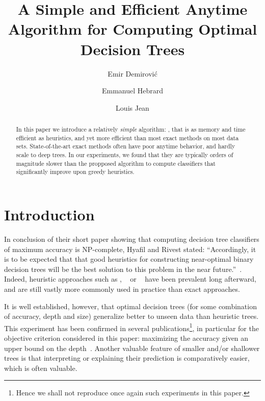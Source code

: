 \documentclass{llncs}
\title{A Simple and Efficient Anytime Algorithm for Computing Optimal Decision Trees}
\author{Emir Demirovi\'c\inst{1} \and Emmanuel Hebrard\inst{2} \and Louis Jean\inst{2}}
\institute{TU DELFT, The Netherlands, email: e.demirovic@tudelft.nl
  \and LAAS-CNRS, Universit\'e de Toulouse, CNRS, France, email: \{hebrard,ljean\}@laas.fr}
\begin{document}
\maketitle






\begin{abstract}
	In this paper we introduce a relatively \emph{simple} algorithm: \budalg, that is as memory and time efficient as heuristics, and yet more efficient than most exact methods on most data sets. State-of-the-art exact methods often have poor anytime behavior, and hardly scale to deep trees. In our experiments, we found that they are typically orders of magnitude slower than the propposed algorithm to compute classifiers that significantly improve upon greedy heuristics. 
\end{abstract}

\section{Introduction}

In conclusion of their short paper showing that computing decision tree classifiers of maximum accuracy is NP-complete, Hyafil and Rivest stated: ``Accordingly, it is to be expected that that good heuristics for constructing near-optimal binary decision trees will be the best solution to this problem in the near future.''~\cite{NPhardTrees}. Indeed, heuristic approaches such as \cart\cite{breiman1984classification}, \idthree~\cite{10.1023/A:1022643204877} or \cfour~\cite{c4-5} have been prevalent long afterward, and are still vastly more commonly used in practice than exact approaches.


It is well established, however, that optimal decision trees (for some combination of accuracy, depth and size) generalize better to unseen data than heuristic trees. This experiment has been confirmed in several publications\footnote{Hence we shall not reproduce once again such experiments in this paper.}, in particular for the objective criterion considered in this paper: maximizing the accuracy given an upper bound on the depth~\cite{avellanedaefficient,bertsimas2017optimal,bertsimas2007classification,DBLP:conf/ijcai/Hu0HH20,DBLP:journals/corr/abs-2007-12652,dl8}. 
Another valuable feature of smaller and/or shallower trees is that interpreting or explaining their prediction is comparatively easier, which is often valuable. 
\end{document}
